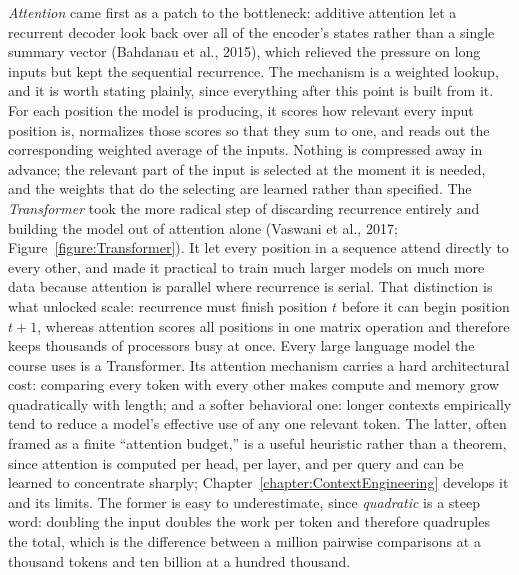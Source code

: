 \emph{Attention} came first as a patch to the bottleneck: additive attention let a recurrent decoder look back over all of the encoder's states rather than a single summary vector (Bahdanau et al., 2015), which relieved the pressure on long inputs but kept the sequential recurrence.
The mechanism is a weighted lookup, and it is worth stating plainly, since everything after this point is built from it.
For each position the model is producing, it scores how relevant every input position is, normalizes those scores so that they sum to one, and reads out the corresponding weighted average of the inputs.
Nothing is compressed away in advance; the relevant part of the input is selected at the moment it is needed, and the weights that do the selecting are learned rather than specified.
The \emph{Transformer} took the more radical step of discarding recurrence entirely and building the model out of attention alone (Vaswani et al., 2017; Figure~\ref{figure:Transformer}).
It let every position in a sequence attend directly to every other, and made it practical to train much larger models on much more data because attention is parallel where recurrence is serial.
That distinction is what unlocked scale: recurrence must finish position $t$ before it can begin position $t+1$, whereas attention scores all positions in one matrix operation and therefore keeps thousands of processors busy at once.
Every large language model the course uses is a Transformer.
Its attention mechanism carries a hard architectural cost: comparing every token with every other makes compute and memory grow quadratically with length; and a softer behavioral one: longer contexts empirically tend to reduce a model's effective use of any one relevant token.
The latter, often framed as a finite ``attention budget,'' is a useful heuristic rather than a theorem, since attention is computed per head, per layer, and per query and can be learned to concentrate sharply; Chapter~\ref{chapter:ContextEngineering} develops it and its limits.
The former is easy to underestimate, since \emph{quadratic} is a steep word: doubling the input doubles the work per token and therefore quadruples the total, which is the difference between a million pairwise comparisons at a thousand tokens and ten billion at a hundred thousand.

